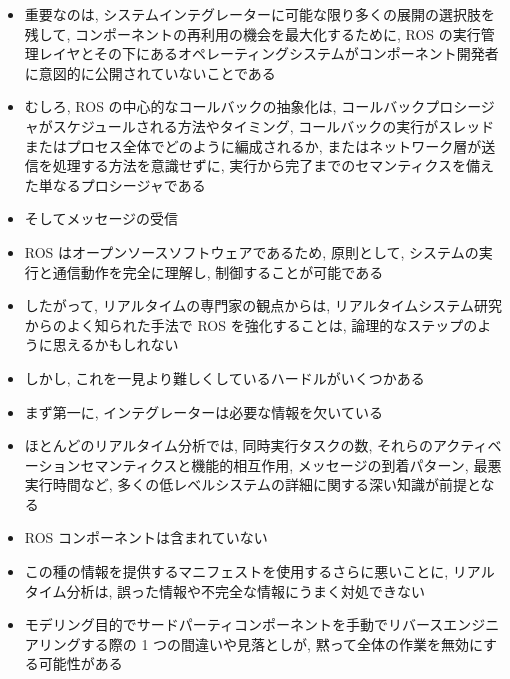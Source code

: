 \begin{frame}{}
    \begin{itemize}
        \item 重要なのは, システムインテグレーターに可能な限り多くの展開の選択肢を残して, コンポーネントの再利用の機会を最大化するために, ROS の実行管理レイヤとその下にあるオペレーティングシステムがコンポーネント開発者に意図的に公開されていないことである
        \item むしろ, ROS の中心的なコールバックの抽象化は, コールバックプロシージャがスケジュールされる方法やタイミング, コールバックの実行がスレッドまたはプロセス全体でどのように編成されるか, またはネットワーク層が送信を処理する方法を意識せずに, 実行から完了までのセマンティクスを備えた単なるプロシージャである
        \item そしてメッセージの受信
    \end{itemize}
\end{frame}

\begin{frame}{}
    \begin{itemize}
        \item ROS はオープンソースソフトウェアであるため, 原則として, システムの実行と通信動作を完全に理解し, 制御することが可能である
        \item したがって, リアルタイムの専門家の観点からは, リアルタイムシステム研究からのよく知られた手法で ROS を強化することは, 論理的なステップのように思えるかもしれない
        \item しかし, これを一見より難しくしているハードルがいくつかある
        \item まず第一に, インテグレーターは必要な情報を欠いている
    \end{itemize}
\end{frame}

\begin{frame}{}
    \begin{itemize}
        \item ほとんどのリアルタイム分析では, 同時実行タスクの数, それらのアクティベーションセマンティクスと機能的相互作用, メッセージの到着パターン, 最悪実行時間など, 多くの低レベルシステムの詳細に関する深い知識が前提となる
        \item ROS コンポーネントは含まれていない
        \item この種の情報を提供するマニフェストを使用するさらに悪いことに, リアルタイム分析は, 誤った情報や不完全な情報にうまく対処できない
        \item モデリング目的でサードパーティコンポーネントを手動でリバースエンジニアリングする際の 1 つの間違いや見落としが, 黙って全体の作業を無効にする可能性がある
    \end{itemize}
\end{frame}

